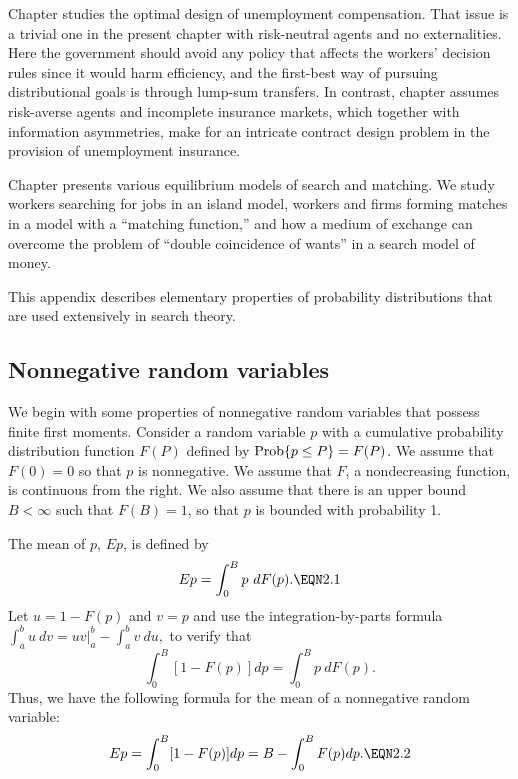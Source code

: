 Chapter 
 studies the optimal design of unemployment compensation.
That issue is a trivial one in the present chapter with risk-neutral
agents and no externalities. Here the government should avoid any
policy that affects the workers' decision rules since it would
harm efficiency, and the first-best way of pursuing distributional
goals is through lump-sum transfers. In contrast, chapter
 assumes
risk-averse agents and incomplete insurance markets, which together with
information asymmetries, make for an intricate contract design problem in
the provision of unemployment insurance.

Chapter 
 presents various equilibrium models of search and matching.
We study workers searching for jobs in an island model, workers and firms
forming matches in a model with a ``matching function,'' and how a medium
of exchange can overcome the problem of ``double coincidence of wants'' in
a search model of money.


\label{app:nonneg}%
  This appendix  describes elementary properties of probability distributions
that are used extensively in search theory.
\subsection{Nonnegative random variables}

We begin with some properties of nonnegative random variables that
possess finite first moments.  Consider a random variable $p$ with a cumulative
probability distribution function $F(P)$ defined by ${\rm Prob}\{p\le P\} =F(P)$.  We
assume that $F(0)=0$ so  that $p$ is nonnegative.  We assume
that %
$F$, a nondecreasing function, is
continuous from the right.  We also assume that there is an
upper bound $B<\infty$ such that $F(B)=1$, so that $p$ is bounded with
probability 1.

The mean of $p$, $Ep$, is defined by
$$Ep=\int_0^B p\ dF(p).\EQN 2.1$$
Let $u=1-F(p)$ and $v=p$ and use the integration-by-parts formula
$\int_a^b u\ dv=uv \Big\vert_a^b -\int_a^b v\ du,$
to verify that
$$\int_0^B [1-F(p)]dp =\int_0^B p\ dF(p).$$
Thus, we have the following formula for the mean of a
nonnegative random variable:
$$Ep=\int_0^B [1-F(p)]dp = B - \int_0^B F(p)dp .\EQN 2.2$$


